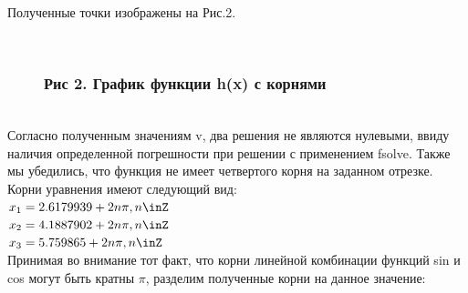 \documentclass[russian,utf8,nocolumnxxxi,nocolumnxxxii]{eskdtext}
\begin{document}
Полученные точки изображены на Рис.2.
\begin{figure}[H]
\begin{center}
\begin{minipage}[h]{0.65\linewidth}
  \\
\frametitle{Рис 2. График функции h(x) с корнями}
\end{minipage}
\end{center}
\end{figure}
\\
Согласно полученным значениям v, два решения не являются нулевыми, ввиду наличия определенной погрешности при решении с применением  fsolve. Также мы убедились, что функция не имеет четвертого корня на заданном отрезке.\\

Корни уравнения имеют следующий вид:\\
$x_1=2.6179939+2n\pi,n\inZ$\\
$x_2=4.1887902+2n\pi,n\inZ$\\
$x_3=5.759865+2n\pi,n\inZ$\\

Принимая во внимание тот факт, что корни линейной комбинации функций sin и cos могут быть кратны $\pi$, разделим полученные корни на данное значение:
\end{document}
